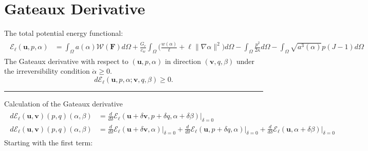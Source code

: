 \documentclass[12pt,3p]{article}
\numberwithin{equation}{section}
\begin{document}
\section{Gateaux Derivative}
The total potential energy functional: 
\begin{align*}
\begin{split}
\mathcal{E}_{\ell}\left(\boldsymbol{u}, p, \alpha\right) &= \int_{\Omega} a(\alpha) \mathcal{W}(\mathbf{F}) d \Omega+\frac{G_{c}}{c_{w}} \int_{\Omega} \bigg(\frac{w(\alpha)}{\ell}+\ell\|\nabla \alpha\|^{2} \bigg) d \Omega- \int_{\Omega} \frac{p^{2}}{2 \kappa} d \Omega - \int_{\Omega} \sqrt{a^{3}(\alpha)} p(J-1) d \Omega 
\end{split}
\end{align*}
The Gateaux derivative with respect to $(\bm{u},p,\alpha)$ in direction $(\bm{v}, q, \beta)$ under the irreversibility condition $\dot{\alpha}\ge0$.
\begin{equation}
d\mathcal{E}_\ell \left(\bm{u}, p, \alpha; \bm{v}, q, \beta \right) \ge 0.
\end{equation}
\noindent\rule{\linewidth}{0.5pt} %
Calculation of the Gateaux derivative
\begin{align*}
\begin{split}
d\mathcal{E}_\ell (\bm{u}, \bm{v}) (p, q) (\alpha, \beta) &= \frac{d}{d \delta} \mathcal{E}_\ell (\bm{u} + \delta \bm{v}, p + \delta q, \alpha + \delta \beta) \big\rvert_{\delta = 0} \\
d\mathcal{E}_\ell (\bm{u}, \bm{v}) (p, q) (\alpha, \beta) 
	&= \frac{d}{d \delta} \mathcal{E}_\ell (\bm{u} + \delta \bm{v}, \alpha) \big\rvert_{\delta = 0} 
	+ \frac{d}{d \delta} \mathcal{E}_\ell (\bm{u}, p + \delta q, \alpha) \big\rvert_{\delta = 0} 
	+ \frac{d}{d \delta} \mathcal{E}_\ell (\bm{u}, \alpha + \delta \beta) \big\rvert_{\delta = 0}
\end{split}
\end{align*}
Starting with the first term: 
\end{document}
